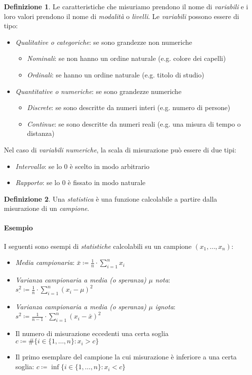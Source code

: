 \documentclass[12pt, a4paper]{report}
\theoremstyle{definition}
\newtheorem{definition}{Definizione}[section]
\begin{document}
\begin{definition}
	Le caratteristiche che misuriamo prendono il nome di \emph{variabili} e i loro
	valori prendono il nome di \emph{modalità} o \emph{livelli}. Le \emph{variabili}
	possono essere di tipo:
	\begin{itemize}
		\item \emph{Qualitative o categoriche}: se sono grandezze non numeriche
		\begin{itemize}
			\item \emph{Nominali}: se non hanno un ordine naturale (e.g. colore dei capelli)
			\item \emph{Ordinali}: se hanno un ordine naturale (e.g. titolo di studio)
		\end{itemize}
		\item \emph{Quantitative o numeriche}: se sono grandezze numeriche
		\begin{itemize}
			\item \emph{Discrete}: se sono descritte da numeri interi (e.g. numero di persone)
			\item \emph{Continue}: se sono descritte da numeri reali (e.g. una misura di tempo o distanza)
		\end{itemize}
	\end{itemize}

	Nel caso di \emph{variabili numeriche}, la scala di misurazione può essere
	di due tipi:
	\begin{itemize}
		\item \emph{Intervallo}: se lo $0$ è scelto in modo arbitrario
		\item \emph{Rapporto}: se lo $0$ è fissato in modo naturale
	\end{itemize}
\end{definition}

\begin{definition}
	Una \emph{statistica} è una funzione calcolabile a partire dalla misurazione
	di un \emph{campione}.
\end{definition}

\paragraph{Esempio}
I seguenti sono esempi di \emph{statistiche} calcolabili su un campione
\((x_1,\dots,x_n)\):
\begin{itemize}
	\item \emph{Media campionaria}: \(\bar{x}\coloneqq\frac{1}{n}\cdot \sum_{i=1}^nx_i\)
	\item \emph{Varianza campionaria a media (o speranza) $\mu$ nota}: \(s_\cdot ^2
	\coloneqq\frac{1}{n}\cdot \sum_{i=1}^n(x_i-\mu)^2\)
	\item \emph{Varianza campionaria a media (o speranza) $\mu$ ignota}: \(s^2
	\coloneqq\frac{1}{n-1}\cdot \sum_{i=1}^n(x_i-\bar{x})^2\)
	\item Il numero di misurazione eccedenti una certa soglia \(c\coloneqq \#\{
	i\in\{1,\dots,n\}:x_i>c\}\)
	\item Il primo esemplare del campione la cui misurazione è inferiore a una
	certa soglia: \(c\coloneqq\inf\{i\in\{1,\dots,n\}:x_i<c\}\)
\end{itemize}
\end{document}
